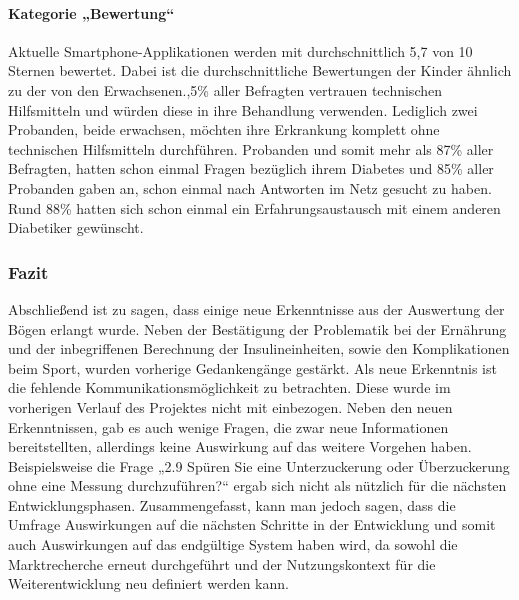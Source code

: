 \documentclass[a4paper,11pt]{article}%
\renewcommand{\\}{\vspace*{0.5\baselineskip} \newline}
\begin{document}
\paragraph{Kategorie „Bewertung“}\mbox{}\\
	Aktuelle Smartphone-Applikationen werden mit durchschnittlich 5,7 von 10 Sternen bewertet. Dabei ist die durchschnittliche Bewertungen der Kinder ähnlich zu der von den Erwachsenen.,5\% aller Befragten vertrauen technischen Hilfsmitteln und würden diese in ihre Behandlung verwenden. Lediglich zwei Probanden, beide erwachsen, möchten ihre Erkrankung komplett ohne technischen Hilfsmitteln durchführen. Probanden und somit mehr als 87\% aller Befragten, hatten schon einmal Fragen bezüglich ihrem Diabetes und 85\% aller Probanden gaben an, schon einmal nach Antworten im Netz gesucht zu haben. Rund 88\% hatten sich schon einmal ein Erfahrungsaustausch mit einem anderen Diabetiker gewünscht.
\subsubsection{Fazit}
	Abschließend ist zu sagen, dass einige neue Erkenntnisse aus der Auswertung der Bögen erlangt wurde. Neben der Bestätigung der Problematik bei der Ernährung und der inbegriffenen Berechnung der Insulineinheiten, sowie den Komplikationen beim Sport, wurden vorherige Gedankengänge gestärkt. Als neue Erkenntnis ist die fehlende Kommunikationsmöglichkeit zu betrachten. Diese wurde im vorherigen Verlauf des Projektes nicht mit einbezogen. Neben den neuen Erkenntnissen, gab es auch wenige Fragen, die zwar neue Informationen bereitstellten, allerdings keine Auswirkung auf das weitere Vorgehen haben. Beispielsweise die Frage „2.9 Spüren Sie eine Unterzuckerung oder Überzuckerung ohne eine Messung durchzuführen?“ ergab sich nicht als nützlich für die nächsten Entwicklungsphasen. Zusammengefasst, kann man jedoch sagen, dass die Umfrage Auswirkungen auf die nächsten Schritte in der Entwicklung und somit auch Auswirkungen auf das endgültige System haben wird, da sowohl die Marktrecherche erneut durchgeführt und der Nutzungskontext für die Weiterentwicklung neu definiert werden kann.
\newpage
\appendix
\end{document}
